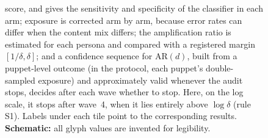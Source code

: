 \begin{figure}[t]
{score, and gives the sensitivity and specificity of the classifier in each
arm; exposure is corrected arm by arm, because error rates can differ when the
content mix differs; the amplification ratio is estimated for each persona and
compared with a registered margin $[1/\delta,\delta]$; and a confidence
sequence for $\mathrm{AR}(d)$, built from a puppet-level outcome (in the
protocol, each puppet's double-sampled exposure) and approximately valid
whenever the audit stops, decides after each wave whether to stop. Here, on
the log scale, it stops after wave~4, when it lies entirely above
$\log\delta$ (rule S1). Labels under each tile point to the corresponding results.
\textbf{Schematic:} all glyph values are invented for legibility.}
\label{fig:design}
\end{figure}
